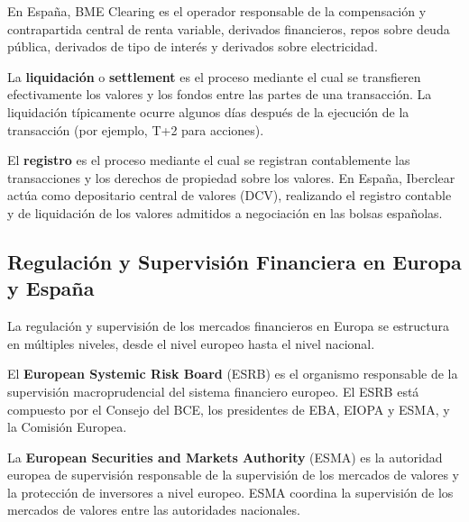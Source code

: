 En España, BME Clearing es el operador responsable de la compensación y contrapartida central de renta variable, derivados financieros, repos sobre deuda pública, derivados de tipo de interés y derivados sobre electricidad.

\begin{definicion}
La \textbf{liquidación} o \textbf{settlement} es el proceso mediante el cual se transfieren efectivamente los valores y los fondos entre las partes de una transacción. La liquidación típicamente ocurre algunos días después de la ejecución de la transacción (por ejemplo, T+2 para acciones).
\end{definicion}

\begin{definicion}[Registro]
El \textbf{registro} es el proceso mediante el cual se registran contablemente las transacciones y los derechos de propiedad sobre los valores. En España, Iberclear actúa como depositario central de valores (DCV), realizando el registro contable y de liquidación de los valores admitidos a negociación en las bolsas españolas.
\end{definicion}

\subsection{Regulación y Supervisión Financiera en Europa y España}

La regulación y supervisión de los mercados financieros en Europa se estructura en múltiples niveles, desde el nivel europeo hasta el nivel nacional.

\begin{definicion}
El \textbf{European Systemic Risk Board} (ESRB) es el organismo responsable de la supervisión macroprudencial del sistema financiero europeo. El ESRB está compuesto por el Consejo del BCE, los presidentes de EBA, EIOPA y ESMA, y la Comisión Europea.
\end{definicion}

\begin{definicion}
La \textbf{European Securities and Markets Authority} (ESMA) es la autoridad europea de supervisión responsable de la supervisión de los mercados de valores y la protección de inversores a nivel europeo. ESMA coordina la supervisión de los mercados de valores entre las autoridades nacionales.
\end{definicion}

